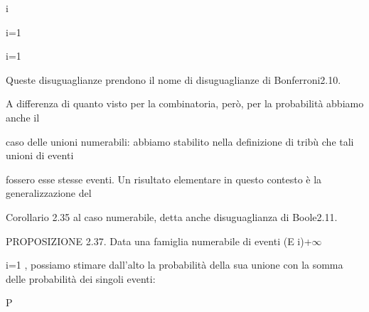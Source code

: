 \documentclass[a4paper,portrait,12pt]{article}
\begin{document}
\begin{flushleft}
i
\end{flushleft}





\begin{flushleft}
i=1
\end{flushleft}





\begin{flushleft}
i=1
\end{flushleft}





\begin{flushleft}
Queste disuguaglianze prendono il nome di disuguaglianze di Bonferroni2.10.
\end{flushleft}


\begin{flushleft}
A differenza di quanto visto per la combinatoria, per\`{o}, per la probabilit\`{a} abbiamo anche il
\end{flushleft}


\begin{flushleft}
caso delle unioni numerabili: abbiamo stabilito nella definizione di tribù che tali unioni di eventi
\end{flushleft}


\begin{flushleft}
fossero esse stesse eventi. Un risultato elementare in questo contesto \`{e} la generalizzazione del
\end{flushleft}


\begin{flushleft}
Corollario 2.35 al caso numerabile, detta anche disuguaglianza di Boole2.11.
\end{flushleft}


\begin{flushleft}
PROPOSIZIONE 2.37. Data una famiglia numerabile di eventi (E i)+$\infty$
\end{flushleft}


\begin{flushleft}
i=1 , possiamo stimare dall'alto la probabilit\`{a} della sua unione con la somma delle probabilit\`{a} dei singoli eventi:
\end{flushleft}


\begin{flushleft}
P
\end{flushleft}
\end{document}

